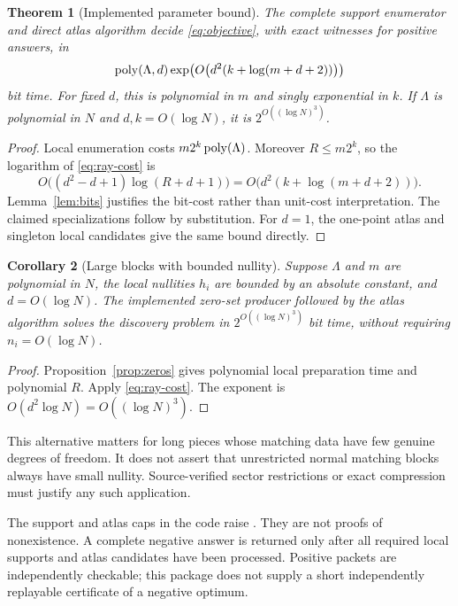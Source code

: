 \documentclass[11pt,a4paper]{article}
\newtheorem{theorem}{Theorem}[section]
\newtheorem{corollary}[theorem]{Corollary}
\theoremstyle{definition}
\theoremstyle{remark}
\begin{document}
\begin{theorem}[Implemented parameter bound]
\label{thm:cost}
The complete support enumerator and direct atlas algorithm decide \eqref{eq:objective}, with exact witnesses for positive answers, in
\begin{equation}
 \operatorname{poly}(\Lambda,d)\exp\!\left(O\bigl(d^2(k+\log(m+d+2))\bigr)\right)
 \label{eq:cost}
\end{equation}
bit time. For fixed $d$, this is polynomial in $m$ and singly exponential in $k$. If $\Lambda$ is polynomial in $N$ and $d,k=O(\log N)$, it is $2^{O((\log N)^3)}$.
\end{theorem}
\begin{proof}
Local enumeration costs $m2^k\operatorname{poly}(\Lambda)$. Moreover $R\le m2^k$, so the logarithm of \eqref{eq:ray-cost} is
\[
 O\bigl((d^2-d+1)\log(R+d+1)\bigr)
 =O\bigl(d^2(k+\log(m+d+2))\bigr).
\]
Lemma~\ref{lem:bits} justifies the bit-cost rather than unit-cost interpretation. The claimed specializations follow by substitution. For $d=1$, the one-point atlas and singleton local candidates give the same bound directly.
\end{proof}

\begin{corollary}[Large blocks with bounded nullity]
\label{cor:nullity}
Suppose $\Lambda$ and $m$ are polynomial in $N$, the local nullities $h_i$ are bounded by an absolute constant, and $d=O(\log N)$. The implemented zero-set producer followed by the atlas algorithm solves the discovery problem in $2^{O((\log N)^3)}$ bit time, without requiring $n_i=O(\log N)$.
\end{corollary}
\begin{proof}
Proposition~\ref{prop:zeros} gives polynomial local preparation time and polynomial $R$. Apply \eqref{eq:ray-cost}. The exponent is $O(d^2\log N)=O((\log N)^3)$.
\end{proof}

This alternative matters for long pieces whose matching data have few genuine degrees of freedom. It does not assert that unrestricted normal matching blocks always have small nullity. Source-verified sector restrictions or exact compression must justify any such application.

The support and atlas caps in the code raise . They are not proofs of nonexistence. A complete negative answer is returned only after all required local supports and atlas candidates have been processed. Positive packets are independently checkable; this package does not supply a short independently replayable certificate of a negative optimum.
\end{document}
